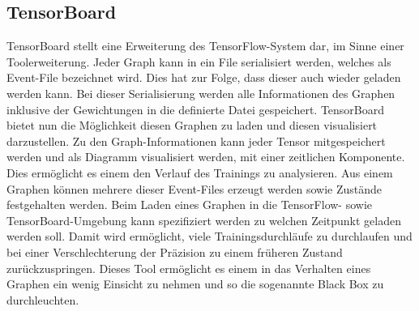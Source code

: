 \subsection{TensorBoard}

TensorBoard stellt eine Erweiterung des TensorFlow-System dar, im Sinne einer Toolerweiterung. 
Jeder Graph kann in ein File serialisiert werden, welches als Event-File bezeichnet wird. 
Dies hat zur Folge, dass dieser auch wieder geladen werden kann. 
Bei dieser Serialisierung werden alle Informationen des Graphen inklusive der Gewichtungen in die definierte Datei gespeichert.
TensorBoard bietet nun die Möglichkeit diesen Graphen zu laden und diesen visualisiert darzustellen.
Zu den Graph-Informationen kann jeder Tensor mitgespeichert werden und als Diagramm visualisiert werden, mit einer zeitlichen Komponente. 
Dies ermöglicht es einem den Verlauf des Trainings zu analysieren. 
Aus einem Graphen können mehrere dieser Event-Files erzeugt werden sowie Zustände festgehalten werden. 
Beim Laden eines Graphen in die TensorFlow- sowie TensorBoard-Umgebung kann spezifiziert werden zu welchen Zeitpunkt geladen werden soll. 
Damit wird ermöglicht, viele Trainingsdurchläufe zu durchlaufen und bei einer Verschlechterung der Präzision zu einem früheren Zustand zurückzuspringen.
Dieses Tool ermöglicht es einem in das Verhalten eines Graphen ein wenig Einsicht zu nehmen und so die sogenannte Black Box zu durchleuchten. 

